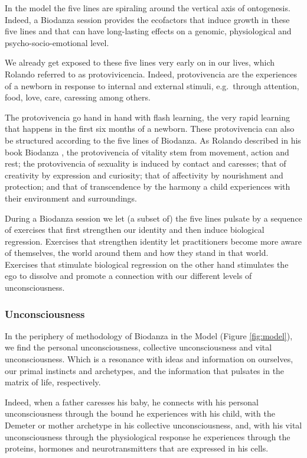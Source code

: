 \documentclass[
  11pt,
]{book}
\begin{document}
In the model the five lines are spiraling around the vertical axis of ontogenesis. Indeed, a Biodanza session provides the ecofactors that induce growth in these five lines and that can have long-lasting effects on a genomic, physiological and psycho-socio-emotional level.

We already get exposed to these five lines very early on in our lives, which Rolando referred to as protovivicencia. Indeed, protovivencia are the experiences of a newborn in response to internal and external stimuli, e.g.~through attention, food, love, care, caressing among others.

The protovivencia go hand in hand with flash learning, the very rapid learning that happens in the first six months of a newborn. These protovivencia can also be structured according to the five lines of Biodanza. As Rolando described in his book Biodanza \citep{toro2008}, the protovivencia of vitality stem from movement, action and rest; the protovivencia of sexuality is induced by contact and caresses; that of creativity by expression and curiosity; that of affectivity by nourishment and protection; and that of transcendence by the harmony a child experiences with their environment and surroundings.

During a Biodanza session we let (a subset of) the five lines pulsate by a sequence of exercises that first strengthen our identity and then induce biological regression.
Exercises that strengthen identity let practitioners become more aware of themselves, the world around them and how they stand in that world. Exercises that stimulate biological regression on the other hand stimulates the ego to dissolve and promote a connection with our different levels of unconsciousness.

\hypertarget{unconsciousness}{%
\subsubsection{Unconsciousness}\label{unconsciousness}}

In the periphery of methodology of Biodanza in the Model (Figure \ref{fig:model}), we find the personal unconsciousness, collective unconsciousness and vital unconsciousness.
Which is a resonance with ideas and information on ourselves, our primal instincts and archetypes, and the information that pulsates in the matrix of life, respectively.

Indeed, when a father caresses his baby, he connects with
his personal unconsciousness through the bound he experiences with his child, with the Demeter or mother archetype in his collective unconsciousness, and, with his vital unconsciousness through the physiological response he experiences through the proteins, hormones and neurotransmitters that are expressed in his cells.
\end{document}
